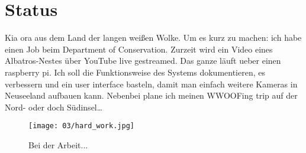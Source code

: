 \chapter{Status}

Kia ora aus dem Land der langen weißen Wolke. Um es kurz zu machen:
ich habe einen Job beim Department of Conservation. Zurzeit wird ein
Video eines Albatros-Nestes \"uber YouTube live gestreamed. Das ganze
l\"auft ueber einen raspberry pi. Ich soll die Funktionsweise des
Systems dokumentieren, es verbessern und ein user interface basteln,
damit man einfach weitere Kameras in Neuseeland aufbauen
kann. Nebenbei plane ich meinen WWOOFing trip auf der Nord- oder doch
S\"udinsel\ldots{}

\begin{figure}[h]
  \centering
  \texttt{[image: 03/hard\_work.jpg]}
  \caption*{Bei der Arbeit...}
\end{figure}
